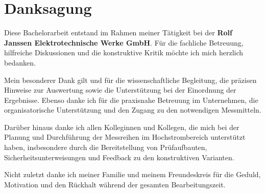 
\section*{Danksagung}

Diese Bachelorarbeit entstand im Rahmen meiner Tätigkeit bei der \textbf{Rolf Janssen Elektrotechnische Werke GmbH}. Für die fachliche Betreuung, hilfreiche Diskussionen und die konstruktive Kritik möchte ich mich herzlich bedanken.

Mein besonderer Dank gilt \textbf{\betreuerEins} und \textbf{\betreuerZwei} für die wissenschaftliche Begleitung, die präzisen Hinweise zur Auswertung sowie die Unterstützung bei der Einordnung der Ergebnisse. Ebenso danke ich \textbf{\betreuerDrei} für die praxisnahe Betreuung im Unternehmen, die organisatorische Unterstützung und den Zugang zu den notwendigen Messmitteln.

Darüber hinaus danke ich allen Kolleginnen und Kollegen, die mich bei der Planung und Durchführung der Messreihen im Hochstrombereich unterstützt haben, insbesondere durch die Bereitstellung von Prüfaufbauten, Sicherheitsunterweisungen und Feedback zu den konstruktiven Varianten.

Nicht zuletzt danke ich meiner Familie und meinem Freundeskreis für die Geduld, Motivation und den Rückhalt während der gesamten Bearbeitungszeit.
